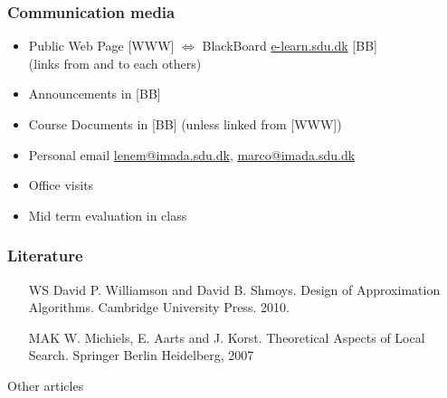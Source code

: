 \documentclass[handout,usepdftitle=false,aspectratio=169,smaller,compress,sans,fleqn,xcolor=dvipsnames,fleqn,table]{beamer}
\begin{document}
  \begin{frame}%
    \frametitle{Communication media}
    \medskip\begin{itemize}\itemsep=3ex
    
\item Public Web Page [WWW] $\Leftrightarrow$ BlackBoard \url{e-learn.sdu.dk} [BB]\\
 (links from and to each others)
\item \alert{Announcements} in [BB]
\item \alert{Course Documents} in [BB] (unless linked from [WWW]) 
\item Personal email \url{lenem@imada.sdu.dk}, \url{marco@imada.sdu.dk}
\item Office visits

\medskip

\item \alert{Mid term evaluation} in class
\end{itemize}

\end{frame}


\begin{frame}%
  \frametitle{Literature}

\begin{itemize}
\itemsep=3ex
\item[WS] David P. Williamson and David B. Shmoys. Design of Approximation Algorithms. Cambridge University Press. 2010.

  \item[MAK] W. Michiels, E. Aarts and J. Korst. \alert{Theoretical Aspects of
    Local Search}. Springer Berlin Heidelberg, 2007
\end{itemize}

\bigskip

Other articles
\end{frame}
\end{document}

